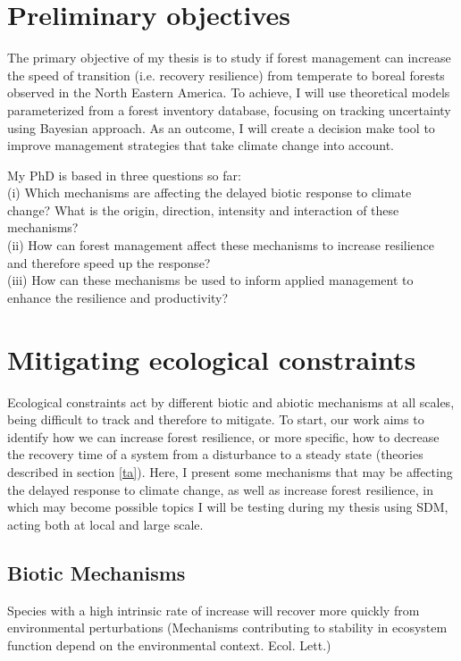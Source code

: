 \section{Preliminary objectives}

The primary objective of my thesis is to study if forest management can increase the speed of transition (i.e. recovery resilience) from temperate to boreal forests observed in the North Eastern America.
To achieve, I will use theoretical models parameterized from a forest inventory database, focusing on tracking uncertainty using Bayesian approach.
As an outcome, I will create a decision make tool to improve management strategies that take climate change into account.

My PhD is based in three questions so far: \\
(i) Which mechanisms are affecting the delayed biotic response to climate change? What is the origin, direction, intensity and interaction of these mechanisms? \\
(ii) How can forest management affect these mechanisms to increase resilience and therefore speed up the response? \\
(iii) How can these mechanisms be used to inform applied management to enhance the resilience and productivity?

\section{Mitigating ecological constraints}

Ecological constraints act by different biotic and abiotic mechanisms at all scales, being difficult to track and therefore to mitigate.
To start, our work aims to identify how we can increase forest resilience, or more specific, how to decrease the recovery time of a system from a disturbance to a steady state (theories described in section \ref{ta}).
Here, I present some mechanisms that may be affecting the delayed response to climate change, as well as increase forest resilience, in which may become possible topics I will be testing during my thesis using SDM, acting both at local and large scale.

\subsection{Biotic Mechanisms}
Species with a high intrinsic rate of increase will recover more quickly from environmental perturbations (Mechanisms contributing to stability in ecosystem function depend on the environmental context. Ecol. Lett.)

